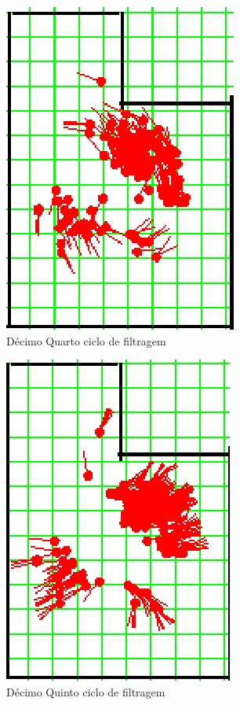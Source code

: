 \begin{figure}[H]
  \centering
  \includegraphics[scale=0.6]{figuras/cen1_ex3/15.eps}
  \caption[Décimo Quarto Ciclo de Filtragem]{Décimo Quarto ciclo de filtragem}
  \label{img:cen1_ex3_15}
\end{figure}

\begin{figure}[H]
  \centering
  \includegraphics[scale=0.6]{figuras/cen1_ex3/16.eps}
  \caption[Décimo Quinto Ciclo de Filtragem]{Décimo Quinto ciclo de filtragem}
  \label{img:cen1_ex3_16}
\end{figure}

